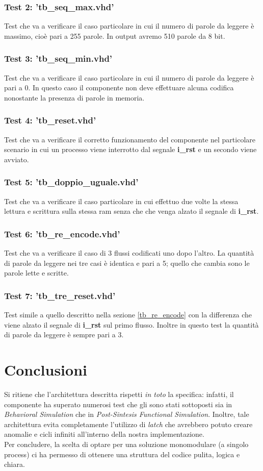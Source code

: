 \documentclass[a4paper]{article}
\begin{document}
\subsubsection{Test 2: 'tb\_seq\_max.vhd'}
Test che va a verificare il caso particolare in cui il numero di parole da leggere è massimo, cioè pari a 255 parole. In output avremo 510 parole da 8 bit.
\subsubsection{Test 3: 'tb\_seq\_min.vhd'}
Test che va a verificare il caso particolare in cui il numero di parole da leggere è pari a 0. In questo caso il componente non deve effettuare alcuna codifica nonostante la presenza di parole in memoria.
\subsubsection{Test 4: 'tb\_reset.vhd'}
Test che va a verificare il corretto funzionamento del componente nel particolare scenario in cui un processo viene interrotto dal segnale \textbf{i\_rst} e un secondo viene avviato.
\subsubsection{Test 5: 'tb\_doppio\_uguale.vhd'}
Test che va a verificare il caso particolare in cui effettuo due volte la stessa lettura e scrittura sulla stessa ram senza che che venga alzato il segnale di \textbf{i\_rst}.
\subsubsection{Test 6: 'tb\_re\_encode.vhd'}
Test che va a verificare il caso di 3 flussi codificati uno dopo l'altro. La quantità di parole da leggere nei tre casi è identica e pari a 5; quello che cambia sono le parole lette e scritte.
\label{tb_re_encode}
\subsubsection{Test 7: 'tb\_tre\_reset.vhd'}
Test simile a quello descritto nella sezione \ref{tb_re_encode} con la differenza che viene alzato il segnale di \textbf{i\_rst} sul primo flusso. Inoltre in questo test la quantità di parole da leggere è sempre pari a 3.
\\

\section{Conclusioni}
Si ritiene che l'architettura descritta rispetti \textit{in toto} la specifica: infatti, il componente ha superato numerosi test che gli sono stati sottoposti sia in \textit{Behavioral Simulation} che in \textit{Post-Sintesis Functional Simulation}. Inoltre, tale architettura evita completamente l'utilizzo di \textit{latch} che avrebbero potuto creare anomalie e cicli infiniti all'interno della nostra implementazione.\\
 Per concludere, la scelta di optare per una soluzione monomodulare (a singolo process) ci ha permesso di ottenere una struttura del codice pulita, logica e chiara.
\end{document}
